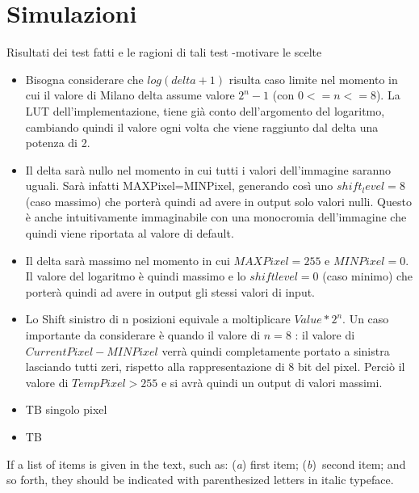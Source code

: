 \documentclass{article}
\begin{document}
\section{Simulazioni}
\label{main-text}
Risultati  dei  test  fatti  e  le ragioni di tali test -motivare le scelte
\begin{itemize}
\item Bisogna considerare che \(log (delta +1)\) risulta caso limite nel momento in cui il valore di Milano delta assume valore \(2^{n}-1\) (con \(0<=n<=8\)). La LUT dell'implementazione, tiene già conto dell'argomento del logaritmo, cambiando quindi il valore ogni volta che viene raggiunto dal delta una potenza di 2.  
\item Il delta sarà nullo nel momento in cui tutti i valori dell'immagine saranno uguali. Sarà infatti MAXPixel=MINPixel, generando così uno \(shift_level=8\) (caso massimo) che porterà quindi ad avere in output solo valori nulli. Questo è anche intuitivamente immaginabile con una monocromia dell'immagine che quindi viene riportata al valore di default.
\item Il delta sarà massimo nel momento in cui \(MAXPixel=255\) e \(MINPixel=0\). Il valore del logaritmo è quindi massimo e lo \(shift level=0\) (caso minimo) che porterà quindi ad avere in output gli stessi valori di input.
\item Lo Shift sinistro di n posizioni equivale a moltiplicare \(Value*2^{n}\). Un caso importante da considerare è quando il valore di \(n=8\) : il valore di \(Current Pixel-MINPixel\) verrà quindi completamente portato a sinistra lasciando tutti zeri, rispetto alla rappresentazione di 8 bit del pixel. Perciò il valore di \(Temp Pixel>255\) e si avrà quindi un output di valori massimi.
\item TB singolo pixel	 
\item TB 
\end{itemize}
If a list of items is given in the text, such as: (\textit{a}) first item; (\textit{b})~second item; and so forth, they should be indicated with parenthesized letters in italic typeface.
\end{document}
